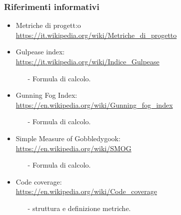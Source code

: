 \subsubsection{Riferimenti informativi}
 \begin{itemize}
	\item Metriche di progett:o \\
 		\url{https://it.wikipedia.org/wiki/Metriche_di_progetto}
 	\item Gulpease index: \\
 		\url{https://it.wikipedia.org/wiki/Indice_Gulpease}
 	\begin{itemize}
 		\item[-] Formula di calcolo.
	\end{itemize}
	\item Gunning Fog Index: \\
		\url{https://en.wikipedia.org/wiki/Gunning_fog_index}
		\begin{itemize}
		\item[-] Formula di calcolo.
		\end{itemize}
	\item Simple Measure of Gobbledygook: \\ 
		 \url{https://en.wikipedia.org/wiki/SMOG}
		 \begin{itemize}
		 	\item[-] Formula di calcolo.
		 \end{itemize}
	\item Code coverage: \\ 
		\url{https://en.wikipedia.org/wiki/Code_coverage}
		\begin{itemize}
		\item[-] struttura e definizione metriche.
		\end{itemize}
\end{itemize}